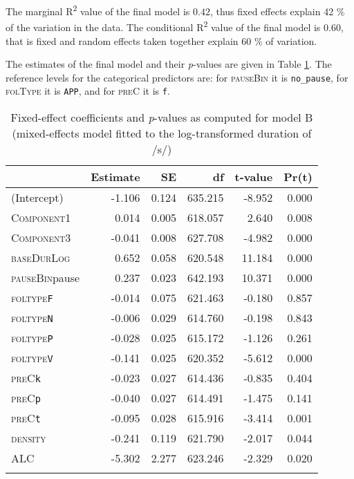 The marginal R\textsuperscript{2} value of the final model is $0.42$, thus fixed effects explain 42 \% of the variation in the data. The conditional R\textsuperscript{2} value of the final model is $0.60$, that is fixed and random effects taken together explain 60 \% of variation.

The estimates of the final model and their \textit{p}-values are given in Table \ref{tab:5.9}. The reference levels for the categorical predictors are: for \textsc{pauseBin} it is \texttt{no\_pause}, for \textsc{folType} it is \texttt{APP}, and for \textsc{preC} it is \texttt{f}.

\begin{table}\fontsize{10}{11}
\caption{Fixed-effect coefficients and \textit{p}-values as computed for model B (mixed-effects model fitted to the log-transformed duration of /s/)}
\label{tab:5.9}
\centering
\begin{tabular}{lrrrrr} 
\lsptoprule
~             & Estimate & SE    & df      & t-value & Pr(\textbar{}t\textbar{})  \\ 
\midrule
(Intercept)   & -1.106   & 0.124 & 635.215 & -8.952  & 0.000                      \\
\textsc{Component1}    & 0.014    & 0.005 & 618.057 & 2.640   & 0.008                      \\
\textsc{Component3}    & -0.041   & 0.008 & 627.708 & -4.982  & 0.000                      \\
\textsc{baseDurLog}    & 0.652    & 0.058 & 620.548 & 11.184  & 0.000                      \\
\textsc{pauseBin}pause & 0.237    & 0.023 & 642.193 & 10.371  & 0.000                      \\
\textsc{foltype}\texttt{F}      & -0.014   & 0.075 & 621.463 & -0.180  & 0.857                      \\
\textsc{foltype}\texttt{N}      & -0.006   & 0.029 & 614.760 & -0.198  & 0.843                      \\
\textsc{foltype}\texttt{P}      & -0.028   & 0.025 & 615.172 & -1.126  & 0.261                      \\
\textsc{foltype}\texttt{V}      & -0.141   & 0.025 & 620.352 & -5.612  & 0.000                      \\
\textsc{preC}\texttt{k}         & -0.023   & 0.027 & 614.436 & -0.835  & 0.404                      \\
\textsc{preC}\texttt{p}         & -0.040   & 0.027 & 614.491 & -1.475  & 0.141                      \\
\textsc{preC}\texttt{t}         & -0.095   & 0.028 & 615.916 & -3.414  & 0.001                      \\
\textsc{density}       & -0.241   & 0.119 & 621.790 & -2.017  & 0.044                      \\
\textsc{ALC}           & -5.302   & 2.277 & 623.246 & -2.329  & 0.020                      \\
\lspbottomrule
\end{tabular}
\end{table}


